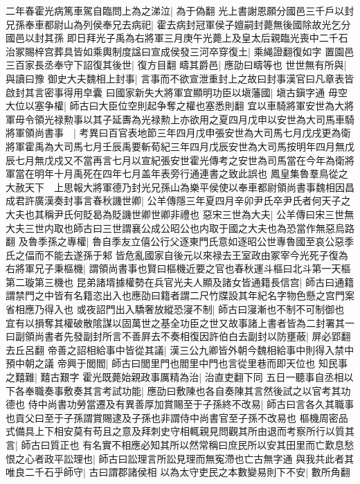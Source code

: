 二年春霍光病篤車駕自臨問上為之涕泣|{
	為于偽翻}
光上書謝恩願分國邑三千戶以封兄孫奉車都尉山為列侯奉兄去病祀|{
	霍去病封冠軍侯子嬗嗣封薨無後國除故光乞分國邑以封其孫}
即日拜光子禹為右將軍三月庚午光薨上及皇太后親臨光喪中二千石治冢賜梓宫葬具皆如乘輿制度諡曰宣成侯發三河卒穿復土|{
	乘䋲證翻復如字}
置園邑三百家長丞奉守下詔復其後世|{
	復方目翻}
疇其爵邑|{
	應劭曰疇等也}
世世無有所與|{
	與讀曰豫}
御史大夫魏相上封事|{
	言事而不欲宣泄重封上之故曰封事漢官曰凡章表皆啟封其言密事得用皁囊}
曰國家新失大將軍宜顯明功臣以塡藩國|{
	塡古鎭字通}
毋空大位以塞争權|{
	師古曰大臣位空則起争奪之權也塞悉則翻}
宜以車騎將軍安世為大將軍毋令領光禄勲事以其子延夀為光禄勲上亦欲用之夏四月戊申以安世為大司馬車騎將軍領尚書事　|{
	考異曰百官表地節三年四月戊申張安世為大司馬七月戊戌更為衛將軍霍禹為大司馬七月壬辰禹要斬荀紀三年四月戊辰安世為大司馬按明年四月無戊辰七月無戊戍又不當再言七月以宣紀張安世霍光傳考之安世為司馬當在今年為衛將軍當在明年十月禹死在四年七月盖年表旁行通連書之致此誤也}
鳳皇集魯羣鳥從之大赦天下　上思報大將軍德乃封光兄孫山為樂平侯使以奉車都尉領尚書事魏相因昌成君許廣漢奏封事言春秋譏世卿|{
	公羊傳隱三年夏四月辛卯尹氏卒尹氏者何天子之大夫也其稱尹氏何貶曷為貶譏世卿世卿非禮也}
惡宋三世為大夫|{
	公羊傳曰宋三世無大夫三世内取也師古曰三世謂襄公成公昭公也内取于國之大夫也為恐當作無惡烏路翻}
及魯季孫之專權|{
	魯自季友立僖公行父逐東門氏意如逐昭公世專魯國至哀公惡季氏之偪而不能去遂孫于邾}
皆危亂國家自後元以來禄去王室政由冢宰今光死子復為右將軍兄子秉樞機|{
	謂領尚書事也賢曰樞機近要之官也春秋運斗樞曰北斗第一天樞第二璇第三機也}
昆弟諸壻據權勢在兵官光夫人顯及諸女皆通籍長信宫|{
	師古曰通籍謂禁門之中皆有名籍恣出入也應劭曰籍者謂二尺竹牒設其年紀名字物色懸之宫門案省相應乃得入也}
或夜詔門出入驕奢放縱恐寖不制|{
	師古曰寖漸也不制不可制御也}
宜有以損奪其權破散隂謀以固萬世之基全功臣之世又故事諸上書者皆為二封署其一曰副領尚書者先發副封所言不善屛去不奏相復因許伯白去副封以防壅蔽|{
	屏必郢翻去丘呂翻}
帝善之詔相給事中皆從其議|{
	漢三公九卿皆外朝今魏相給事中則得入禁中預中朝之議}
帝興于閭閻|{
	師古曰閭里門也閻里中門也言從里巷而即天位也}
知民事之囏難|{
	囏古艱字}
霍光既薨始親政事厲精為治|{
	治直吏翻下同}
五日一聽事自丞相以下各奉職奏事敷奏其言考試功能|{
	應劭曰敷陳也各自奏陳其言然後試之以官考其功德也}
侍中尚書功勞當遷及有異善厚加賞賜至于子孫終不改易|{
	師古曰言各久其職事也貢父曰至于子孫謂賞賜逮及子孫也非謂侍中尚書官至子孫不改易也}
樞機周密品式備具上下相安莫有苟且之意及拜刺史守相輒親見問觀其所由退而考察所行以質其言|{
	師古曰質正也}
有名實不相應必知其所以然常稱曰庶民所以安其田里而亡歎息愁恨之心者政平訟理也|{
	師古曰訟理言所訟見理而無寃滯也亡古無字通}
與我共此者其唯良二千石乎師守|{
	古曰謂郡諸侯相}
以為太守吏民之本數變易則下不安|{
	數所角翻}

